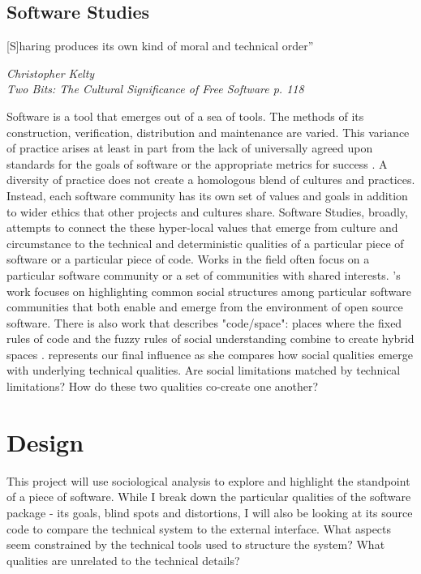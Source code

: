\documentclass[a4paper,man,natbib]{apa6}
\begin{document}
   \subsection*{Software Studies}

   \epigraph{[S]haring produces its own kind of moral and technical order”}{\textit{Christopher Kelty \\ Two Bits: The Cultural Significance of Free Software p. 118}}

   Software is a tool that emerges out of a sea of tools. The methods of its construction, verification, distribution and maintenance are varied. This variance of practice arises at least in part from the lack of universally agreed upon standards for the goals of software or the appropriate metrics for success \citep{Ensmenger2012-kz}. A diversity of practice does not create a homologous blend of cultures and practices. Instead, each software community has its own set of values and goals in addition to wider ethics that other projects and cultures share. Software Studies, broadly, attempts to connect the these hyper-local values that emerge from culture and circumstance to the technical and deterministic qualities of a particular piece of software or a particular piece of code. Works in the field often focus on a particular software community or a set of communities with shared interests. \citet{Kelty2008-jm}'s work focuses on highlighting common social structures among particular software communities that both enable and emerge from the environment of open source software. There is also work that describes "code/space": places where the fixed rules of code and the fuzzy rules of social understanding combine to create hybrid spaces \citep{Bridle2018-nd,Kitchin2011-af}. \citet{Bivens2017-tc} represents our final influence as she compares how social qualities emerge with underlying technical qualities. Are social limitations matched by technical limitations? How do these two qualities co-create one another? 

   \section*{Design}
   This project will use sociological analysis to explore and highlight the standpoint of a piece of software. While I break down the particular qualities of the software package -  its goals, blind spots and distortions, I will also be looking at its source code to compare the technical system to the external interface. What aspects seem constrained by the technical tools used to structure the system? What qualities are unrelated to the technical details?
\end{document}
